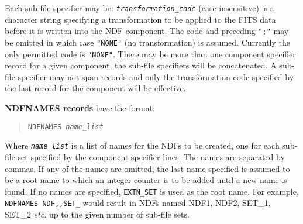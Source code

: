 \documentclass[twoside,11pt]{starlink}
\begin{document}
{{{{              Each sub-file specifier may be:
           \sstitem
           \texttt{\textit{transformation\_code}} (case-insensitive) is a
              character string specifying a  transformation to be applied to
              the FITS data before it is written into the NDF component.
              The code and
              preceding \texttt{";"} may be omitted in which case \texttt{"NONE"} (no
              transformation) is assumed.  Currently the only permitted code
              is \texttt{"NONE"}.
           }
          There may be more than one component specifier record for a given
          component, the sub-file specifiers will be concatenated. A
          sub-file specifier may not span records and only the transformation
          code specified by the last record for the component will be
          effective.
          \medskip

        \textbf{NDFNAMES records} have the format:
          \begin{quote}
          \texttt{NDFNAMES \textit{name\_list}}
          \end{quote}
           Where \texttt{\textit{name\_list}} is a list of names for the NDFs
           to be created, one
           for each sub-file set specified by the component specifier lines.
           The names are separated by commas. If any of the names are omitted,
           the last name specified is assumed to be a root name to which an
           integer counter is to be added until a new name is found.  If no
           names are specified, \texttt{EXTN\_SET} is used as the root name.
           For example,  \texttt{NDFNAMES NDF,,SET\_}
           would result in NDFs named NDF1, NDF2, SET\_1, SET\_2 \textit{etc.}
           up to the given number of sub-file sets.

}}}
\end{document}
